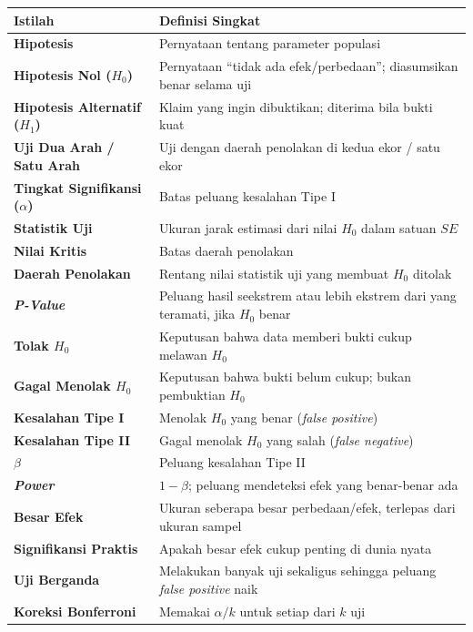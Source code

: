 \documentclass[
  indonesian,
  letterpaper,
]{book}
\newcounter{none} %
\begin{document}
{\def\LTcaptype{none} %
\begin{longtable}[]{@{}
  >{\raggedright\arraybackslash}p{}
  >{\raggedright\arraybackslash}p{}@{}}
\toprule\noalign{}
\begin{minipage}[b]{\linewidth}\raggedright
Istilah
\end{minipage} & \begin{minipage}[b]{\linewidth}\raggedright
Definisi Singkat
\end{minipage} \\
\midrule\noalign{}
\endhead
\bottomrule\noalign{}
\endlastfoot
\textbf{Hipotesis} & Pernyataan tentang parameter populasi \\
\textbf{Hipotesis Nol (\(H_0\))} & Pernyataan ``tidak ada
efek/perbedaan''; diasumsikan benar selama uji \\
\textbf{Hipotesis Alternatif (\(H_1\))} & Klaim yang ingin dibuktikan;
diterima bila bukti kuat \\
\textbf{Uji Dua Arah / Satu Arah} & Uji dengan daerah penolakan di kedua
ekor / satu ekor \\
\textbf{Tingkat Signifikansi (\(\alpha\))} & Batas peluang kesalahan
Tipe I \\
\textbf{Statistik Uji} & Ukuran jarak estimasi dari nilai \(H_0\) dalam
satuan \(SE\) \\
\textbf{Nilai Kritis} & Batas daerah penolakan \\
\textbf{Daerah Penolakan} & Rentang nilai statistik uji yang membuat
\(H_0\) ditolak \\
\textbf{\emph{P-Value}} & Peluang hasil seekstrem atau lebih ekstrem
dari yang teramati, jika \(H_0\) benar \\
\textbf{Tolak \(H_0\)} & Keputusan bahwa data memberi bukti cukup
melawan \(H_0\) \\
\textbf{Gagal Menolak \(H_0\)} & Keputusan bahwa bukti belum cukup;
bukan pembuktian \(H_0\) \\
\textbf{Kesalahan Tipe I} & Menolak \(H_0\) yang benar (\emph{false
positive}) \\
\textbf{Kesalahan Tipe II} & Gagal menolak \(H_0\) yang salah
(\emph{false negative}) \\
\textbf{\(\beta\)} & Peluang kesalahan Tipe II \\
\textbf{\emph{Power}} & \(1 - \beta\); peluang mendeteksi efek yang
benar-benar ada \\
\textbf{Besar Efek} & Ukuran seberapa besar perbedaan/efek, terlepas
dari ukuran sampel \\
\textbf{Signifikansi Praktis} & Apakah besar efek cukup penting di dunia
nyata \\
\textbf{Uji Berganda} & Melakukan banyak uji sekaligus sehingga peluang
\emph{false positive} naik \\
\textbf{Koreksi Bonferroni} & Memakai \(\alpha/k\) untuk setiap dari
\(k\) uji \\
\end{longtable}
}
\end{document}

